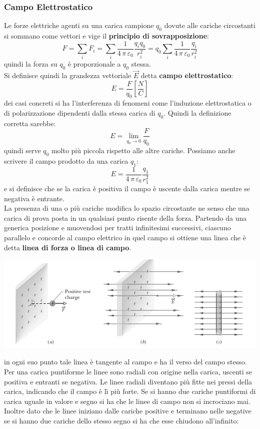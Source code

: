 \documentclass[a4paper,12pt, oneside]{book}
\begin{document}
\subsubsection{Campo Elettrostatico}
Le forze elettriche agenti su una carica campione $q_0$ dovute alle cariche circostanti si sommano come vettori e vige il \textbf{principio di sovrapposizione}:
$$F=\sum_i F_i=\sum_i \frac{1}{4\,\pi\,\varepsilon_0}\frac{q_iq_0}{r_i^2}=q_0\sum_i\frac{1}{4\,\pi\,\varepsilon_0}\frac{q_i}{r_i^2}$$
quindi la forza su $q_0$ è proporzionale a $q_0$ stessa.\\
Si definisce quindi la grandezza vettoriale $\vec{E}$ detta \textbf{campo elettrostatico}:
$$E=\frac{F}{q_0}\left[\frac{N}{C}\right]$$
dei casi concreti si ha l'interferenza di fenomeni come l'induzione elettrostatica o di polarizzazione dipendenti dalla stessa carica di $q_0$. Quindi la definizione corretta sarebbe:
$$E=\lim_{q_0\to 0}\frac{F}{q_0}$$
quindi serve $q_0$ molto più piccola rispetto alle altre cariche. Possiamo anche scrivere il campo prodotto da una carica $q_1$:
$$E=\frac{1}{4\,\pi\,\varepsilon_0}\frac{q_1}{r_1^2}$$
e si definisce che se la carica è positiva il campo è uscente dalla carica mentre se negativa è entrante.\\
La presenza di una o più cariche modifica lo spazio circostante ne senso che una carica di prova posta in un qualsiasi punto risente della forza. Partendo da una generica posizione e muovendosi per tratti infinitesimi successivi, ciascuno parallelo e concorde al campo elettrico in quel campo si ottiene una linea che è detta \textbf{linea di forza o linea di campo}.
\begin{center}
\includegraphics[scale=0.7]{img/ele.png}
\end{center}
in ogni suo punto tale linea è tangente al campo e ha il verso del campo stesso. Per una carica puntiforme le linee sono radiali con origine nella carica, uscenti se positiva e entranti se negativa. Le linee radiali diventano più fitte nei pressi della carica, indicando che il campo è lì più forte. Se si hanno due cariche puntiformi di carica uguale in valore e segno si ha che le linee di campo non si incrociano mai. Inoltre dato che le linee iniziano dalle cariche positive e terminano nelle negative se si hanno due cariche dello stesso segno si ha che esse chiudono all'infinito:
\end{document}
